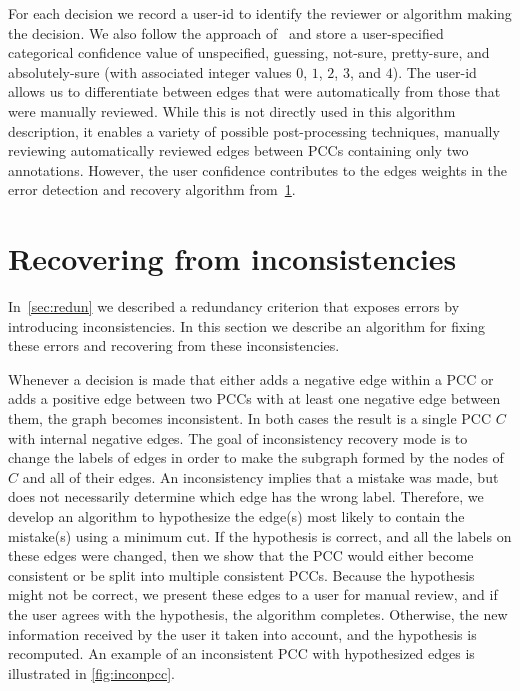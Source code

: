 For each decision we record a user-id to identify the reviewer or algorithm making the decision.
We also follow the approach of~\cite{branson_visual_2010} and store a user-specified categorical confidence value
  of unspecified, guessing, not-sure, pretty-sure, and absolutely-sure (with associated integer values $0$, $1$,
  $2$, $3$, and $4$).
The user-id allows us to differentiate between edges that were automatically from those that were manually
  reviewed.
While this is not directly used in this algorithm description, it enables a variety of possible post-processing
  techniques, \eg{} manually reviewing automatically reviewed edges between PCCs containing only two annotations.
However, the user confidence contributes to the edges weights in the error detection and recovery algorithm
  from~\cref{sec:incon}.


\section{Recovering from inconsistencies}\label{sec:incon}

In~\cref{sec:redun} we described a redundancy criterion that exposes errors by introducing inconsistencies.
In this section we describe an algorithm for fixing these errors and recovering from these inconsistencies.

Whenever a decision is made that either adds a negative edge within a PCC or adds a positive edge between two
  PCCs with at least one negative edge between them, the graph becomes inconsistent.
In both cases the result is a single PCC $C$ with internal negative edges.
The goal of inconsistency recovery mode is to change the labels of edges in order to make the subgraph formed by
  the nodes of $C$ and all of their edges.
An inconsistency implies that a mistake was made, but does not necessarily determine which edge has the wrong
  label.
Therefore, we develop an algorithm to hypothesize the edge(s) most likely to contain the mistake(s) using a
  minimum cut.
If the hypothesis is correct, and all the labels on these edges were changed, then we show that the PCC would
  either become consistent or be split into multiple consistent PCCs.
Because the hypothesis might not be correct, we present these edges to a user for manual review, and if the user
  agrees with the hypothesis, the algorithm completes.
Otherwise, the new information received by the user it taken into account, and the hypothesis is recomputed.
An example of an inconsistent PCC with hypothesized edges is illustrated in \cref{fig:inconpcc}.

